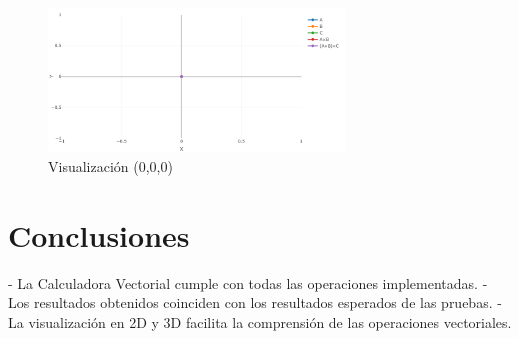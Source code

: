 \documentclass[12pt,a4paper]{article}
\begin{document}
\begin{figure}[H]
    \centering
    \includegraphics[width=0.7\textwidth]{imagenes/0.png} %
    \caption{Visualización (0,0,0)}
\end{figure}


\section*{Conclusiones}
- La Calculadora Vectorial cumple con todas las operaciones implementadas.  
- Los resultados obtenidos coinciden con los resultados esperados de las pruebas.  
- La visualización en 2D y 3D facilita la comprensión de las operaciones vectoriales.
\end{document}
